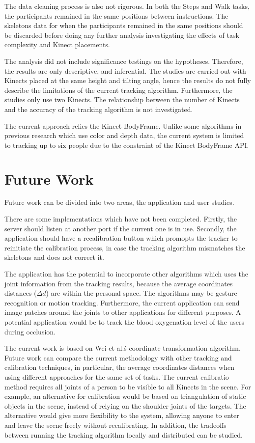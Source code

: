 The data cleaning process is also not rigorous. In both the Steps and Walk tasks, the participants remained in the same positions between instructions. The skeletons data for when the participants remained in the same positions should be discarded before doing any further analysis investigating the effects of task complexity and Kinect placements.

The analysis did not include significance testings on the hypotheses. Therefore, the results are only descriptive, and inferential. The studies are carried out with Kinects placed at the same height and tilting angle, hence the results do not fully describe the limitations of the current tracking algorithm. Furthermore, the studies only use two Kinects. The relationship between the number of Kinects and the accuracy of the tracking algorithm is not investigated.

The current approach relies the Kinect BodyFrame. Unlike some algorithms in previous research which use color and depth data, the current system is limited to tracking up to six people due to the constraint of the Kinect BodyFrame API.

\section{Future Work}
\label{sec:discussion_future_Work}

Future work can be divided into two areas, the application and user studies.

There are some implementations which have not been completed. Firstly, the server should listen at another port if the current one is in use. Secondly, the application should have a recalibration button which promopts the tracker to reinitiate the calibration process, in case the tracking algorithm mismatches the skeletons and does not correct it.

The application has the potential to incorporate other algorithms which uses the joint information from the tracking results, because the average coordinates distances ($\Delta d$) are within the personal space. The algorithms may be gesture recognition or motion tracking. Furthermore, the current application can send image patches around the joints to other applications for different purposes. A potential application would be to track the blood oxygenation level of the users during occlusion.

The current work is based on Wei et al.\'s coordinate transformation algorithm. Future work can compare the current methodology with other tracking and calibration techniques, in particular, the average coordinates distances when using different approaches for the same set of tasks. The current calibratio method requires all joints of a person to be visible to all Kinects in the scene. For example, an alternative for calibration would be based on triangulation of static objects in the scene, instead of relying on the shoulder joints of the targets. The alternative would give more flexibility to the system, allowing anyone to enter and leave the scene freely without recalibrating. In addition, the tradeoffs between running the tracking algorithm locally and distributed can be studied.

